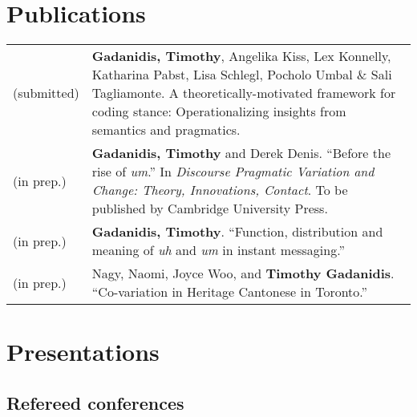 \documentclass[letterpaper]{article}
\begin{document}

\section*{Publications}
\begin{tabular}{p{}p{}}
    (submitted) &\textbf{Gadanidis, Timothy}, Angelika Kiss, Lex Konnelly,
    Katharina Pabst, Lisa Schlegl, Poc\-holo Umbal \& Sali Tagliamonte. A
    theoretically-motivated framework for coding stance: Operationalizing
    insights from semantics and pragmatics. \\
    (in prep.) &\textbf{Gadanidis, Timothy} and Derek Denis. ``Before the rise
    of \emph{um}.'' In \textit{Discourse Pragmatic Variation and Change: Theory,
    Innovations, Contact}. To be published by Cambridge University Press. \\
    (in prep.) &\textbf{Gadanidis, Timothy}. ``Function, distribution and
    meaning of \emph{uh} and \emph{um} in instant messaging.'' \\
    (in prep.) &Nagy, Naomi, Joyce Woo, and \textbf{Timothy Gadanidis}.
    ``Co-variation in Heritage Cantonese in Toronto.'' \\
\end{tabular}

\section*{Presentations}

\subsection*{Refereed conferences}
\end{document}

